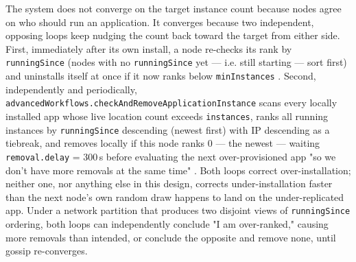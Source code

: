 \begin{remark}
The system does not converge on the target instance count because nodes agree on who should run an
application. It converges because two independent, opposing loops keep nudging the count back
toward the target from either side. First, immediately after its own install, a node re-checks its
rank by \texttt{runningSince} (nodes with no \texttt{runningSince} yet — i.e. still starting —
sort first) and uninstalls itself at once if it now ranks below \texttt{minInstances}
. Second, independently and
periodically, \texttt{advancedWorkflows.\allowbreak{}checkAndRemoveApplicationInstance} scans every locally
installed app whose live location count exceeds \texttt{instances}, ranks all running instances by
\texttt{runningSince} descending (newest first) with IP descending as a tiebreak, and removes
locally if this node ranks 0 — the newest — waiting \texttt{removal.delay} = 300\,s before
evaluating the next over-provisioned app "so we don't have more removals at the same time"
. Both
loops correct over-installation; neither one, nor anything else in this design, corrects
under-installation faster than the next node's own random draw happens to land on the
under-replicated app. Under a network partition that produces two disjoint views of
\texttt{runningSince} ordering, both loops can independently conclude "I am over-ranked," causing
more removals than intended, or conclude the opposite and remove none, until gossip re-converges.
\end{remark}

